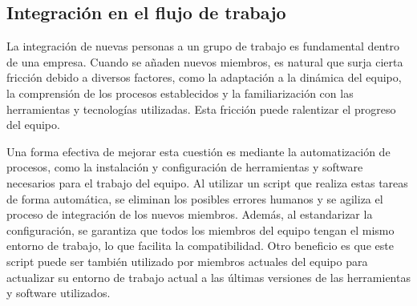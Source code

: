 \subsection{Integración en el flujo de trabajo}
La integración de nuevas personas a un grupo de trabajo es fundamental
dentro de una empresa. Cuando se añaden nuevos miembros, es natural que 
surja cierta fricción debido a diversos factores, como la adaptación a 
la dinámica del equipo, la comprensión de los procesos establecidos y la 
familiarización con las herramientas y tecnologías utilizadas. Esta fricción 
puede ralentizar el progreso del equipo.\medskip

Una forma efectiva de mejorar esta cuestión es mediante la automatización de 
procesos, como la instalación y configuración de herramientas y software necesarios 
para el trabajo del equipo. Al utilizar un script que realiza estas tareas de 
forma automática, se eliminan los posibles errores humanos y se agiliza el proceso 
de integración de los nuevos miembros. Además, al estandarizar la configuración, 
se garantiza que todos los miembros del equipo tengan el mismo entorno de trabajo, 
lo que facilita la compatibilidad. Otro beneficio es que este script puede ser
también utilizado por miembros actuales del equipo para actualizar su entorno de
trabajo actual a las últimas versiones de las herramientas y software utilizados.


